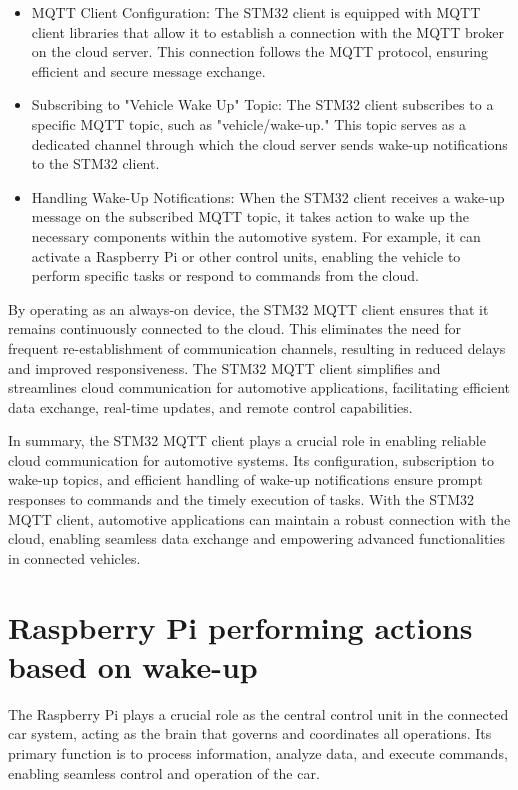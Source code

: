 \documentclass[
12pt,
oneside, 
onehalfspacing, 
nolistspacing, 
parskip, 
chapterinoneline, 
]{AASTCOMPUTER}
\begin{document}
\begin{itemize}
  \item MQTT Client Configuration: The STM32 client is equipped with MQTT client libraries that allow it to establish a connection with the MQTT broker on the cloud server. This connection follows the MQTT protocol, ensuring efficient and secure message exchange.
  \item Subscribing to "Vehicle Wake Up" Topic: The STM32 client subscribes to a specific MQTT topic, such as "vehicle/wake-up." This topic serves as a dedicated channel through which the cloud server sends wake-up notifications to the STM32 client.
  \item Handling Wake-Up Notifications: When the STM32 client receives a wake-up message on the subscribed MQTT topic, it takes action to wake up the necessary components within the automotive system. For example, it can activate a Raspberry Pi or other control units, enabling the vehicle to perform specific tasks or respond to commands from the cloud.
\end{itemize}

By operating as an always-on device, the STM32 MQTT client ensures that it remains continuously connected to the cloud. This eliminates the need for frequent re-establishment of communication channels, resulting in reduced delays and improved responsiveness. The STM32 MQTT client simplifies and streamlines cloud communication for automotive applications, facilitating efficient data exchange, real-time updates, and remote control capabilities.

In summary, the STM32 MQTT client plays a crucial role in enabling reliable cloud communication for automotive systems. Its configuration, subscription to wake-up topics, and efficient handling of wake-up notifications ensure prompt responses to commands and the timely execution of tasks. With the STM32 MQTT client, automotive applications can maintain a robust connection with the cloud, enabling seamless data exchange and empowering advanced functionalities in connected vehicles.

\section{Raspberry Pi performing actions based on wake-up}

The Raspberry Pi plays a crucial role as the central control unit in the connected car system, acting as the brain that governs and coordinates all operations. Its primary function is to process information, analyze data, and execute commands, enabling seamless control and operation of the car.
\end{document}

